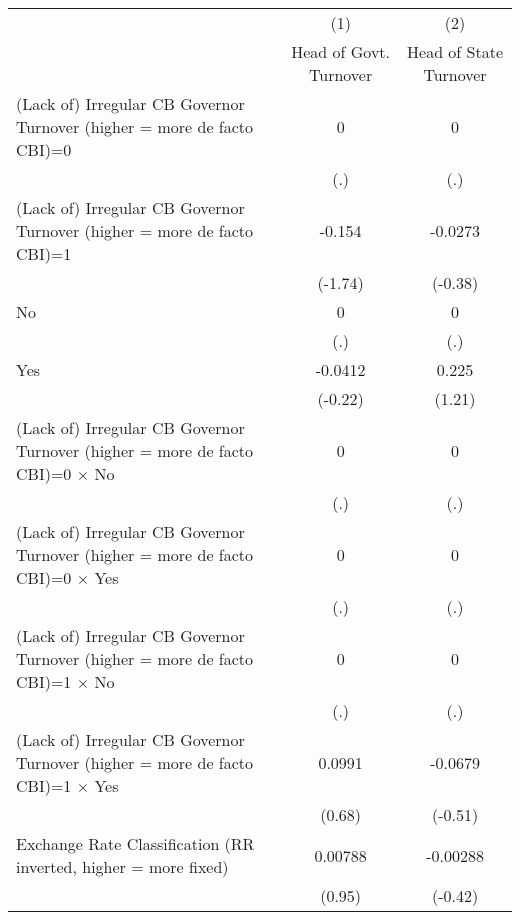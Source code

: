 {
\def\sym#1{\ifmmode^{#1}\else\(^{#1}\)\fi}
\begin{tabular}{l*{2}{c}}
\hline\hline
                &\multicolumn{1}{c}{(1)}&\multicolumn{1}{c}{(2)}\\
                &\multicolumn{1}{c}{Head of Govt. Turnover}&\multicolumn{1}{c}{Head of State Turnover}\\
\hline
(Lack of) Irregular CB Governor Turnover (higher = more de facto CBI)=0&        0         &        0         \\
                &      (.)         &      (.)         \\
[1em]
(Lack of) Irregular CB Governor Turnover (higher = more de facto CBI)=1&   -0.154         &  -0.0273         \\
                &  (-1.74)         &  (-0.38)         \\
[1em]
No              &        0         &        0         \\
                &      (.)         &      (.)         \\
[1em]
Yes             &  -0.0412         &    0.225         \\
                &  (-0.22)         &   (1.21)         \\
[1em]
(Lack of) Irregular CB Governor Turnover (higher = more de facto CBI)=0 $\times$ No&        0         &        0         \\
                &      (.)         &      (.)         \\
[1em]
(Lack of) Irregular CB Governor Turnover (higher = more de facto CBI)=0 $\times$ Yes&        0         &        0         \\
                &      (.)         &      (.)         \\
[1em]
(Lack of) Irregular CB Governor Turnover (higher = more de facto CBI)=1 $\times$ No&        0         &        0         \\
                &      (.)         &      (.)         \\
[1em]
(Lack of) Irregular CB Governor Turnover (higher = more de facto CBI)=1 $\times$ Yes&   0.0991         &  -0.0679         \\
                &   (0.68)         &  (-0.51)         \\
[1em]
Exchange Rate Classification (RR inverted, higher = more fixed)&  0.00788         & -0.00288         \\
                &   (0.95)         &  (-0.42)         \\

\end{tabular}}
